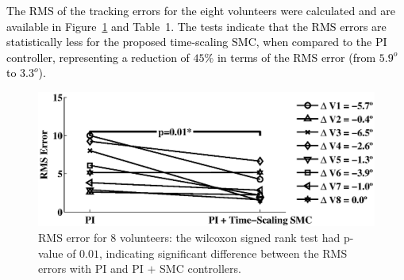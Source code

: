 \documentclass[review]{elsarticle}
\begin{document}
\textcolor{black}{The RMS of the tracking errors for the eight volunteers were calculated and are available in Figure~\ref{fig52_teste_RMS} and Table~1. The tests indicate that the RMS errors are statistically less for the proposed time-scaling SMC, when compared to the PI controller, representing a reduction of $45\%$ in terms of the RMS error (from $5.9^{o}$ to $3.3^{o}$).} 
%
\begin{figure}[!htb]
\begin{center}
\includegraphics[width=13cm]{_ErroRMS_MovCompleto.eps}
\caption{RMS error for 8 volunteers: the wilcoxon signed rank test had p-value of $0.01$, indicating significant difference between the RMS errors with PI and PI $+$ SMC controllers.}
\label{fig52_teste_RMS}
\end{center}
\end{figure}
%
%
\end{document}

